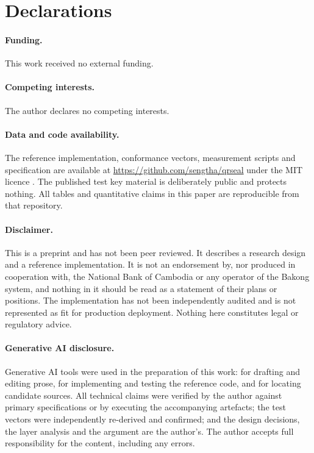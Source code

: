 \documentclass[10pt,a4paper,twocolumn]{article}
\begin{document}
\section*{Declarations}

\paragraph{Funding.} This work received no external funding.

\paragraph{Competing interests.} The author declares no competing interests.

\paragraph{Data and code availability.} The reference implementation,
conformance vectors, measurement scripts and specification are available at
\url{https://github.com/sengtha/qrseal} under the MIT licence
\citep{khsqr2026repo}. The published test key material is
deliberately public and protects nothing. All tables and quantitative claims in
this paper are reproducible from that repository.

\paragraph{Disclaimer.} This is a preprint and has not been peer reviewed. It
describes a research design and a reference implementation. It is not an
endorsement by, nor produced in cooperation with, the National Bank of Cambodia
or any operator of the Bakong system, and nothing in it should be read as a
statement of their plans or positions. The implementation has not been
independently audited and is not represented as fit for production deployment.
Nothing here constitutes legal or regulatory advice.

\paragraph{Generative AI disclosure.} Generative AI tools were used in the
preparation of this work: for drafting and editing prose, for implementing and
testing the reference code, and for locating candidate sources. All technical
claims were verified by the author against primary specifications or by
executing the accompanying artefacts; the test vectors were independently
re-derived and confirmed; and the design decisions, the layer analysis and the
argument are the author's. The author accepts full responsibility for the
content, including any errors.



\end{document}
